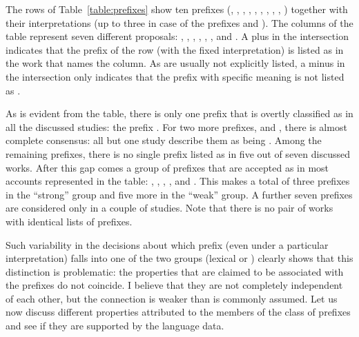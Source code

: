 The rows of Table~\ref{table:prefixes} show ten prefixes (, , , , , , , , , ) together with their interpretations (up to three in case of the prefixes  and ). The columns of the table represent seven different proposals: \citealt{Babko-Malaya:99}, \citealt{Svenonius:04a}, \citealt{Svenonius:04b}, \citealt{Ramchand:04}, \citealt{Romanova:06}, \citealt{Tatevosov:09}, and \citealt{Svenonius:12}. A plus in the intersection indicates that the prefix of the row (with the fixed interpretation) is listed as  in the work that names the column. As  are usually not explicitly listed, a minus in the intersection only indicates that the prefix with specific meaning is not listed as .

As is evident from the table, there is only one prefix that is overtly classified as  in all the discussed studies: the  prefix . For two more prefixes,   and  , there is almost complete consensus: all but one study describe them as being . Among the remaining prefixes, there is no single prefix listed as  in five out of seven discussed works. After this gap comes a group of prefixes that are accepted as  in most accounts represented in the table:  ,  ,  ,  , and  . This makes a total of three prefixes in the ``strong'' group and five more in the ``weak'' group. A further seven prefixes are considered  only in a couple of studies. Note that there is no pair of works with identical lists of  prefixes. 

Such variability in the decisions about which prefix (even under a particular interpretation) falls into one of the two groups (lexical or ) clearly shows that this distinction is problematic: the properties that are claimed to be associated with the  prefixes do not coincide. I believe that they are not completely independent of each other, but the connection is weaker than is commonly assumed. Let us now discuss different properties attributed to the members of the  class of prefixes and see if they are supported by the language data.



